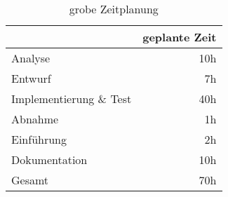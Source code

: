 \begin{table}[h]
\centering
\begin{tabular}{lr}
\rowcolor{gragreen}\multicolumn{1}{l}{\bf{Projektphase}}  & \multicolumn{1}{l}{\bf{geplante Zeit}} \\
\hline
Analyse   & 10h \\

\rowcolor{odd}Entwurf   & 7h \\

Implementierung \& Test &  40h \\

\rowcolor{odd}Abnahme &   1h \\
Einführung   & 2h \\
\rowcolor{odd}Dokumentation   & 10h \\

\hline
\rowcolor{heading}Gesamt  & 70h
\end{tabular}
\caption{grobe Zeitplanung}
\label{table:overviewtimetable}
\end{table}